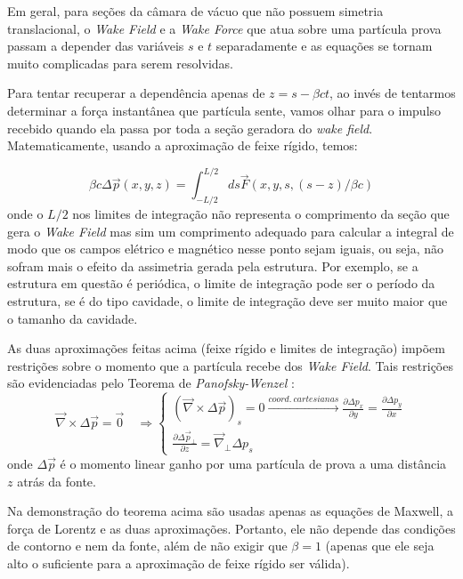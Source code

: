 Em geral, para seções da câmara de vácuo que não possuem simetria translacional, o \textit{Wake Field} e a \textit{Wake Force} que atua sobre uma partícula prova passam a depender das variáveis $s$ e $t$ separadamente e as equações se tornam muito complicadas para serem resolvidas.

Para tentar recuperar a dependência apenas de $z = s - \beta c t$, ao invés de tentarmos determinar a força instantânea que partícula sente, vamos olhar para o impulso recebido quando ela passa por toda a seção geradora do \textit{wake field}. Matematicamente, usando a aproximação de feixe rígido, temos:

\begin{equation}
\beta c \Delta\vec{ p}(x,y,z) = \int^{L/2}_{-L/2}\!\! ds
\vec{F}(x,y,s,(s-z)/\beta c)
\end{equation}
onde o $L/2$ nos limites de integração não representa o comprimento da seção que gera o \textit{Wake Field} mas sim um comprimento adequado para calcular a integral de modo que os campos elétrico e magnético nesse ponto sejam iguais, ou seja, não sofram mais o efeito da assimetria gerada pela estrutura. Por exemplo, se a estrutura em questão é periódica, o limite de integração pode ser o período da estrutura, se é do tipo cavidade, o limite de integração deve ser muito maior que o tamanho da cavidade.

As duas aproximações feitas acima (feixe rígido e limites de integração) impõem restrições sobre o momento que a partícula recebe dos \textit{Wake Field}. Tais restrições são evidenciadas pelo Teorema de \textit{Panofsky-Wenzel} \cite{Bio}:
\begin{equation}
 \vec{\nabla} \times \Delta\vec{ p} = \vec{0}
\quad \Rightarrow \left\lbrace 
\begin{array}{l}
(\vec{\nabla} \times \Delta \vec{p})_s = 0
\xrightarrow{coord.~cartesianas} \frac{\partial \Delta p_x}{\partial y}
= \frac{\partial \Delta p_y}{\partial x} \\
\frac{\partial \Delta \vec{ p}_\bot}{\partial z} =
\vec{\nabla}_\bot \Delta p_s
\end{array} \right.
\end{equation}
onde $\Delta\vec{ p}$ é o momento linear ganho por uma partícula de prova a uma distância $z$ atrás da fonte.

Na demonstração do teorema acima são usadas apenas as equações de Maxwell, a força de Lorentz e as duas aproximações. Portanto, ele não depende das condições de contorno e nem da fonte, além de não exigir que $\beta = 1$ (apenas que ele seja alto o suficiente para a aproximação de feixe rígido ser válida).

